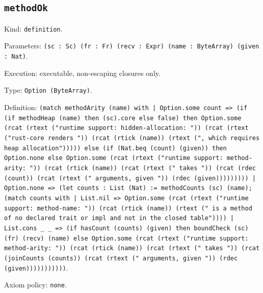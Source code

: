 \documentclass[11pt]{article}
\begin{document}
\subsection*{\texttt{methodOk}}
\noindent Kind: \texttt{definition}.\par
\noindent Parameters: \texttt{(sc : Sc) (fr : Fr) (recv : Expr) (name : ByteArray) (given : Nat)}.\par
\noindent Execution: executable, non-escaping closures only.\par
\noindent Type: \texttt{Option (ByteArray)}.\par
\noindent Definition: \texttt{(match methodArity (name) with | Option.some count => (if (if methodHeap (name) then (sc).core else false) then Option.some (rcat (rtext ("runtime support: hidden-allocation: ")) (rcat (rtext ("rust-core renders ")) (rcat (rtick (name)) (rtext (", which requires heap allocation"))))) else (if (Nat.beq (count) (given)) then Option.none else Option.some (rcat (rtext ("runtime support: method-arity: ")) (rcat (rtick (name)) (rcat (rtext (" takes ")) (rcat (rdec (count)) (rcat (rtext (" arguments, given ")) (rdec (given))))))))) | Option.none => (let counts : List (Nat) := methodCounts (sc) (name); (match counts with | List.nil => Option.some (rcat (rtext ("runtime support: method-name: ")) (rcat (rtick (name)) (rtext (" is a method of no declared trait or impl and not in the closed table")))) | List.cons \_ \_ => (if hasCount (counts) (given) then boundCheck (sc) (fr) (recv) (name) else Option.some (rcat (rtext ("runtime support: method-arity: ")) (rcat (rtick (name)) (rcat (rtext (" takes ")) (rcat (joinCounts (counts)) (rcat (rtext (" arguments, given ")) (rdec (given)))))))))))}.\par
\noindent Axiom policy: \texttt{none}.\par
\end{document}
